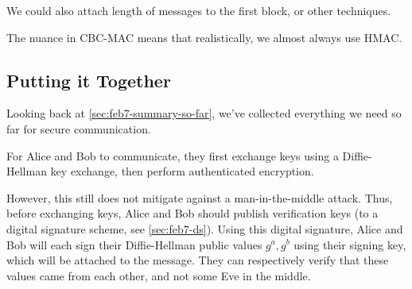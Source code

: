 
We could also attach length of messages to the first block, or other techniques.

The nuance in CBC-MAC means that realistically, we almost always use HMAC.

\subsection{Putting it Together}

Looking back at \cref{sec:feb7-summary-so-far}, we've collected everything we need so far for secure communication.

For Alice and Bob to communicate, they first exchange keys using a Diffie-Hellman key exchange, then perform authenticated encryption.


However, this still does not mitigate against a man-in-the-middle attack. Thus, before exchanging keys, Alice and Bob should publish verification keys (to a digital signature scheme, see \cref{sec:feb7-ds}). Using this digital signature, Alice and Bob will each sign their Diffie-Hellman public values $g^a, g^b$ using their signing key, which will be attached to the message. They can respectively verify that these values came from each other, and not some Eve in the middle.